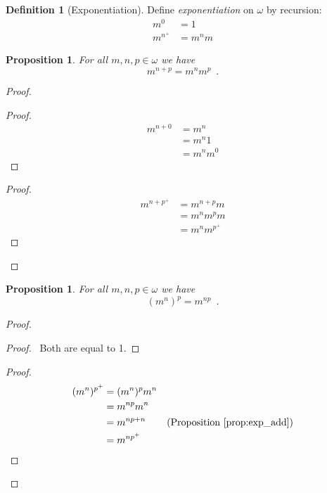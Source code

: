 \documentclass{report}
\let\qed\relax
\newtheorem{prop}[ax]{Proposition}
\theoremstyle{definition}
\newtheorem{df}[ax]{Definition}
\begin{document}
\begin{df}[Exponentiation]
Define \emph{exponentiation} on $\omega$ by recursion:
\begin{align*}
m^0 & = 1 \\
m^{n^+} & = m^n m
\end{align*}
\end{df}

\begin{prop}
\label{prop:exp_add}
For all $m,n,p \in \omega$ we have
\[ m^{n+p} = m^n m^p \enspace . \]
\end{prop}

\begin{proof}
\pf
{}
\begin{proof}
	\pf
	\begin{align*}
		m^{n+0} & = m^n \\
		& = m^n 1 \\
		& = m^n m^0
	\end{align*}
\end{proof}
\begin{proof}
	\pf
	\begin{align*}
		m^{n+p^+} & = m^{n+p}m \\
		& = m^n m^p m \\
		& = m^n m^{p^+}
	\end{align*}
\end{proof}
\qed
\end{proof}

\begin{prop}
For all $m,n,p \in \omega$ we have
\[ (m^n)^p = m^{np} \enspace . \]
\end{prop}

\begin{proof}
\pf
{}
\begin{proof}
	\pf\ Both are equal to 1.
\end{proof}
\begin{proof}
	\pf
	\begin{align*}
		(m^n)^{p^+} & = (m^n)^p m^n \\
		& = m^{np} m^n \\
		& = m^{np+n} & (\text{Proposition \ref{prop:exp_add}}) \\
		& = m^{np^+}
	\end{align*}
\end{proof}
\qed
\end{proof}
\end{document}
